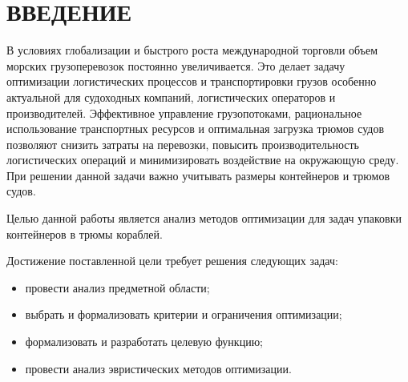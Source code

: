 \chapter*{\hfill{\centering ВВЕДЕНИЕ}\hfill}

В условиях глобализации и быстрого роста международной торговли объем морских грузоперевозок постоянно увеличивается. Это делает задачу оптимизации логистических процессов и транспортировки грузов особенно актуальной для судоходных компаний, логистических операторов и производителей. Эффективное управление грузопотоками, рациональное использование транспортных ресурсов и оптимальная загрузка трюмов судов позволяют снизить затраты на перевозки, повысить производительность логистических операций и минимизировать воздействие на окружающую среду. При решении данной задачи важно учитывать размеры контейнеров и трюмов судов.

Целью данной работы является анализ методов оптимизации для задач упаковки контейнеров в трюмы кораблей.

Достижение поставленной цели требует решения следующих задач:
\begin{itemize}
	\item провести анализ предметной области;
	\item выбрать и формализовать критерии и ограничения оптимизации;
	\item формализовать и разработать целевую функцию;
	\item провести анализ эвристических методов оптимизации.  
\end{itemize}